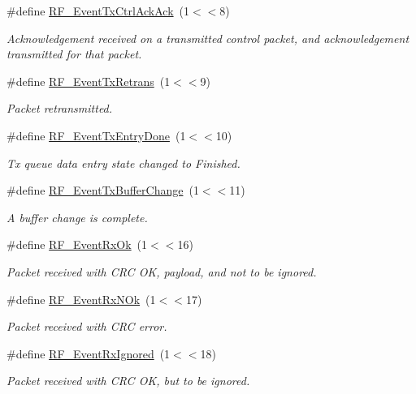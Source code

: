 \begin{DoxyCompactItemize}
\#define \hyperlink{group___r_f___core___events_ga00c6a2c502c6b73310d7168d65134728}{R\+F\+\_\+\+Event\+Tx\+Ctrl\+Ack\+Ack}~(1$<$$<$8)
\begin{DoxyCompactList}\small\item\em Acknowledgement received on a transmitted control packet, and acknowledgement transmitted for that packet. \end{DoxyCompactList}\item 
\#define \hyperlink{group___r_f___core___events_ga2c71299952c2e6f95973f15cd1910012}{R\+F\+\_\+\+Event\+Tx\+Retrans}~(1$<$$<$9)
\begin{DoxyCompactList}\small\item\em Packet retransmitted. \end{DoxyCompactList}\item 
\#define \hyperlink{group___r_f___core___events_ga2fe4925d81a1b1cf0f081801ccdea5c5}{R\+F\+\_\+\+Event\+Tx\+Entry\+Done}~(1$<$$<$10)
\begin{DoxyCompactList}\small\item\em Tx queue data entry state changed to Finished. \end{DoxyCompactList}\item 
\#define \hyperlink{group___r_f___core___events_ga595798fcb9995769a5887839567c8ca7}{R\+F\+\_\+\+Event\+Tx\+Buffer\+Change}~(1$<$$<$11)
\begin{DoxyCompactList}\small\item\em A buffer change is complete. \end{DoxyCompactList}\item 
\#define \hyperlink{group___r_f___core___events_ga8096e854b7ba95ee45054acf8c5d36e4}{R\+F\+\_\+\+Event\+Rx\+Ok}~(1$<$$<$16)
\begin{DoxyCompactList}\small\item\em Packet received with C\+R\+C O\+K, payload, and not to be ignored. \end{DoxyCompactList}\item 
\#define \hyperlink{group___r_f___core___events_ga0c295aa9a2851efa0ec6309ebab52dc8}{R\+F\+\_\+\+Event\+Rx\+N\+Ok}~(1$<$$<$17)
\begin{DoxyCompactList}\small\item\em Packet received with C\+R\+C error. \end{DoxyCompactList}\item 
\#define \hyperlink{group___r_f___core___events_ga2dbeb507eec591b320a4b06f36ce8814}{R\+F\+\_\+\+Event\+Rx\+Ignored}~(1$<$$<$18)
\begin{DoxyCompactList}\small\item\em Packet received with C\+R\+C O\+K, but to be ignored. \end{DoxyCompactList}\item 
$$
\end{DoxyCompactItemize}
